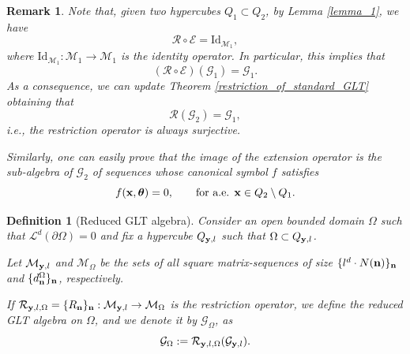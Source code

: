 \documentclass[10pt,a4paper]{amsart}
\newtheorem{rem}{Remark}
\newtheorem{defn}{Definition}
\newcommand{\bftheta}{{\boldsymbol\theta}}
\begin{document}
\begin{rem}\label{rest_surjective}
    Note that, given two hypercubes $Q_1\subset Q_2$, by Lemma \ref{lemma_1}, we have
    \begin{equation*}
        \mathcal{R}\circ\mathcal{E}=\mathrm{Id}_{\mathcal{M}_1},
    \end{equation*}
    where $\mathrm{Id}_{\mathcal{M}_1}:\mathcal{M}_1\to\mathcal{M}_1$ is the identity operator. In particular, this implies that
    \begin{equation*}
        (\mathcal{R}\circ\mathcal{E})(\mathcal{G}_1)=\mathcal{G}_1.
    \end{equation*}
    As a consequence, we can update Theorem \ref{restriction_of_standard_GLT} obtaining that
    \begin{equation*}
        \mathcal{R}(\mathcal{G}_2)=\mathcal{G}_1,
    \end{equation*}
    i.e., the restriction operator is always surjective. 
    
    Similarly, one can easily prove that the image of the extension operator is the sub-algebra of $\mathcal{G}_2$ of sequences whose canonical symbol $f$ satisfies
    \begin{equation*}
        f(\bfx,\bftheta)=0,\qquad \text{for a.e. }\bfx\in Q_2\setminus Q_1.
    \end{equation*}
    \end{rem}

\begin{defn}[Reduced GLT algebra]\label{reduced_GLT}
    Consider an open bounded domain $\Omega$ such that $\mathcal{L}^d(\partial\Omega)=0$ and fix a hypercube $Q_{\mathbf y,l}$ such that $\Omega\subset Q_{\mathbf y,l}$. 
    
    Let $\mathcal{M}_{\mathbf y,l}$ and $\mathcal{M}_{\Omega}$ be the sets of all square matrix-sequences of size $\{l^d\cdot N(\mathbf n)\}_{\mathbf n}$ and $\{d_{\mathbf n}^{\Omega}\}_{\mathbf n}$, respectively. 
    
    If $\mathcal{R}_{\mathbf y,l,\Omega}=\{R_\mathbf n\}_\mathbf n:\mathcal{M}_{\mathbf y,l}\to\mathcal{M}_{\Omega}$ is the restriction operator, we define the reduced GLT algebra on $\Omega$, and we denote it by $\mathcal{G}_{\Omega}$, as
    \begin{equation*}
        \mathcal{G}_{\Omega}:=\mathcal{R}_{\mathbf y,l,\Omega}(\mathcal{G}_{\mathbf y,l}).
    \end{equation*}
\end{defn}
\end{document}
